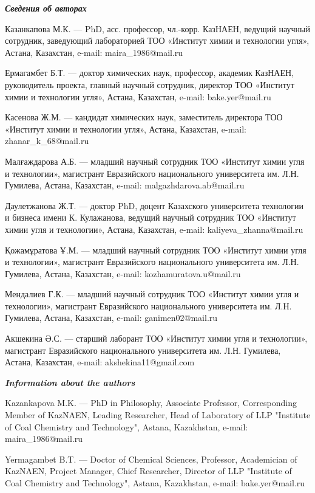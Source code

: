 \begin{authorinfo}
\emph{{\bfseries Сведения об авторах}}  

Казанкапова М.К. — PhD, асс. профессор, чл.-корр. КазНАЕН, ведущий
научный сотрудник, заведующий лабораторией ТОО «Институт химии и
технологии угля», Астана, Казахстан, e-mail: maira\_1986@mail.ru

Ермагамбет Б.Т. — доктор химических наук, профессор, академик КазНАЕН,
руководитель проекта, главный научный сотрудник, директор ТОО
«Институт химии и технологии угля», Астана, Казахстан, e-mail:
bake.yer@mail.ru

Касенова Ж.М. — кандидат химических наук, заместитель директора ТОО
«Институт химии и технологии угля», Астана, Казахстан, e-mail:
zhanar\_k\_68@mail.ru

Малғаждарова А.Б. — младший научный сотрудник ТОО «Институт химии угля
и технологии», магистрант Евразийского национального университета
им. Л.Н. Гумилева, Астана, Казахстан, e-mail: malgazhdarova.ab@mail.ru

Даулетжанова Ж.Т. — доктор PhD, доцент Казахского университета
технологии и бизнеса имени К. Кулажанова, ведущий научный сотрудник
ТОО «Институт химии угля и технологии», Астана, Казахстан, e-mail:
kaliyeva\_zhanna@mail.ru

Қожамұратова Ұ.М. — младший научный сотрудник ТОО «Институт химии угля
и технологии», магистрант Евразийского национального университета
им. Л.Н. Гумилева, Астана, Казахстан, e-mail: kozhamuratova.u@mail.ru

Мендалиев Г.К. — младший научный сотрудник ТОО «Институт химии угля и
технологии», магистрант Евразийского национального университета
им. Л.Н. Гумилева, Астана, Казахстан, e-mail: ganimen02@mail.ru

Акшекина Ә.С. — старший лаборант ТОО «Институт химии угля и
технологии», магистрант Евразийского национального университета
им. Л.Н. Гумилева, Астана, Казахстан, e-mail: akshekina11@gmail.com

\emph{{\bfseries Information about the authors}}  

Kazankapova M.K. — PhD in Philosophy, Associate Professor,
Corresponding Member of KazNAEN, Leading Researcher, Head of
Laboratory of LLP "Institute of Coal Chemistry and Technology",
Astana, Kazakhstan, e-mail: maira\_1986@mail.ru

Yermagambet B.T. — Doctor of Chemical Sciences, Professor, Academician
of KazNAEN, Project Manager, Chief Researcher, Director of LLP
"Institute of Coal Chemistry and Technology", Astana, Kazakhstan,
e-mail: bake.yer@mail.ru


\end{authorinfo}
